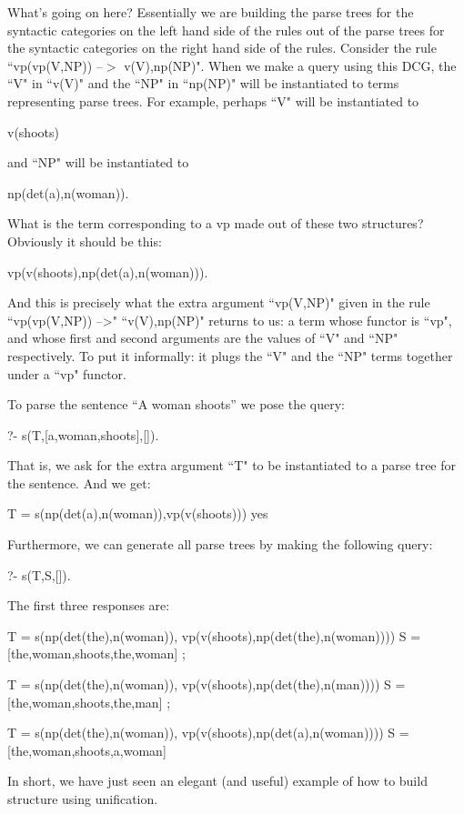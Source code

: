 What's going on here? Essentially we are building the parse trees for
the syntactic categories on the left hand side of the rules out of the
parse trees for the syntactic categories on the right hand side of the
rules. Consider the rule ``vp(vp(V,NP)) --$>$ v(V),np(NP)".  When we make
a query using this DCG, the ``V" in ``v(V)" and the ``NP" in ``np(NP)"
will be instantiated to terms representing parse trees. For example,
perhaps ``V" will be instantiated to
\begin{LPNcodedisplay}
v(shoots)
\end{LPNcodedisplay}
and ``NP" will be instantiated to
\begin{LPNcodedisplay}
np(det(a),n(woman)).
\end{LPNcodedisplay}
What is the term corresponding to a vp made out of these
two structures? Obviously it should be this:
\begin{LPNcodedisplay}
vp(v(shoots),np(det(a),n(woman))).
\end{LPNcodedisplay}
And this is precisely what the extra argument ``vp(V,NP)" given in the
rule ``vp(vp(V,NP)) -->" ``v(V),np(NP)" returns to us:  a term
whose functor is ``vp", and whose first and second arguments are the
values of ``V" and ``NP" respectively. To put it informally: it plugs
the ``V" and the ``NP" terms together under a ``vp" functor.

To parse the sentence ``A woman shoots'' we pose the query:
\begin{LPNcodedisplay}
?- s(T,[a,woman,shoots],[]).
\end{LPNcodedisplay}
That is, we ask for the extra argument ``T" to be instantiated
to a parse tree for the sentence.  And we get:
\begin{LPNcodedisplay}
T = s(np(det(a),n(woman)),vp(v(shoots)))
yes
\end{LPNcodedisplay}

Furthermore, we can generate all parse trees by making the following
query:
\begin{LPNcodedisplay}
?- s(T,S,[]).
\end{LPNcodedisplay}
The first three responses are:
\begin{LPNcodedisplay}
T = s(np(det(the),n(woman)),
      vp(v(shoots),np(det(the),n(woman))))
S = [the,woman,shoots,the,woman] ;

T = s(np(det(the),n(woman)),
      vp(v(shoots),np(det(the),n(man))))
S = [the,woman,shoots,the,man] ;

T = s(np(det(the),n(woman)),
      vp(v(shoots),np(det(a),n(woman))))
S = [the,woman,shoots,a,woman]
\end{LPNcodedisplay}
In short, we have just seen an elegant (and useful) example of how to
build structure using unification.

